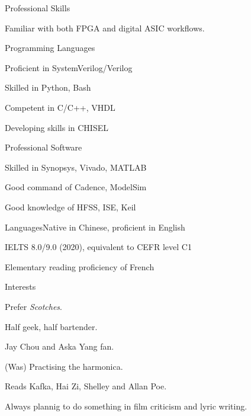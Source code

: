 \documentclass{resume} %
\begin{document}
\begin{rSection}{Professional Skills}

	Familiar with both FPGA and digital ASIC workflows. 
	
	\begin{rSubsection}{Programming Languages}{}{}{}
		\item Proficient in SystemVerilog/Verilog
		\item Skilled in Python, Bash
		\item Competent in C/C++, VHDL
		\item Developing skills in CHISEL
	\end{rSubsection}

	\begin{rSubsection}{Professional Software}{}{}{}
		\item Skilled in Synopsys, Vivado, MATLAB 
		\item Good command of Cadence, ModelSim
		\item Good knowledge of HFSS, ISE, Keil
	\end{rSubsection}

	\begin{rSubsection}{Languages}{}{Native in Chinese, proficient in English}{}
		\item IELTS 8.0/9.0 (2020), equivalent to CEFR level C1
		\item Elementary reading proficiency of French
	\end{rSubsection}

\end{rSection}

\begin{rSection}{Interests}
	\item Prefer \textit{Scotches}.
	\item Half geek, half bartender.
	\item Jay Chou and Aska Yang fan. 
	\item (Was) Practising the harmonica.
	\item Reads Kafka, Hai Zi, Shelley and Allan Poe.
	\item Always plannig to do something in film criticism and lyric writing.
\end{rSection}
\end{document}
